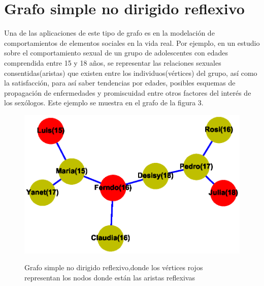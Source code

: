 \documentclass{article}
\begin{document}
\section{Grafo simple no dirigido reflexivo}
Una de las aplicaciones de este tipo de grafo es en la modelación de comportamientos de elementos sociales en la vida real.\linebreak
Por ejemplo, en un estudio sobre el comportamiento sexual de un grupo de adolescentes con edades comprendida entre 15 y 18 años, se representar las relaciones sexuales consentidas(aristas) que existen entre los individuos(vértices) del grupo, así como la satisfacción, para así saber tendencias por edades, posibles esquemas de propagación de enfermedades y promiscuidad entre otros factores del interés de los sexólogos. Este ejemplo se muestra en el grafo de la figura 3.  
  
\begin{center}

\end{center}
\begin{figure}[h]
\begin{center}
\includegraphics[scale=0.7]{Graf3.eps}\\
\caption{Grafo simple no dirigido reflexivo,donde los vértices rojos representan los nodos donde están las aristas reflexivas}
\end{center}
\end{figure}
\end{document}
